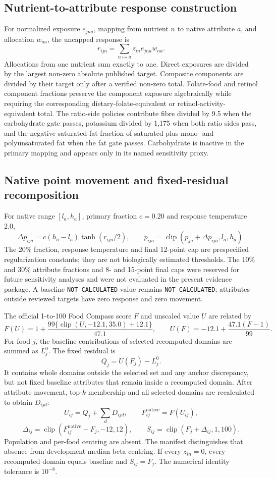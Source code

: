 \subsection*{Nutrient-to-attribute response construction}

For normalized exposure \(e_{jna}\), mapping from nutrient \(n\) to native
attribute \(a\), and allocation \(w_{na}\), the uncapped response is
\[
r_{ija}=\sum_{n\mapsto a}z_{in}e_{jna}w_{na}.
\]
Allocations from one nutrient sum exactly to one. Direct exposures are divided
by the largest non-zero absolute published target. Composite components are
divided by their target only after a verified non-zero total. Folate-food and
retinol component fractions preserve the component exposure algebraically while
requiring the corresponding dietary-folate-equivalent or retinol-activity-
equivalent total. The ratio-side policies contribute fibre divided by 9.5 when
the carbohydrate gate passes, potassium divided by 1,175 when both ratio sides
pass, and the negative saturated-fat fraction of saturated plus mono- and
polyunsaturated fat when the fat gate passes. Carbohydrate is inactive in the
primary mapping and appears only in its named sensitivity proxy.

\subsection*{Native point movement and fixed-residual recomposition}

For native range \([l_a,h_a]\), primary fraction \(c=0.20\) and response
temperature 2.0,
\[
\Delta p_{ija}=c(h_a-l_a)\tanh(r_{ija}/2),\qquad
p_{ija}=\operatorname{clip}(p_{ja}+\Delta p_{ija},l_a,h_a).
\]
The 20\% fraction, response temperature and final 12-point cap are
prespecified regularization constants; they are not biologically estimated
thresholds. The 10\% and 30\% attribute fractions and 8- and 15-point final caps
were reserved for future sensitivity analyses and were not evaluated in the
present evidence package.
A baseline \texttt{NOT\_CALCULATED} value remains
\texttt{NOT\_CALCULATED}; attributes outside reviewed targets have zero
response and zero movement.

The official 1-to-100 Food Compass score \(F\) and unscaled value \(U\) are
related by
\[
F(U)=1+\frac{99\{\operatorname{clip}(U,-12.1,35.0)+12.1\}}{47.1},
\qquad
U(F)=-12.1+\frac{47.1(F-1)}{99}.
\]
For food \(j\), the baseline contributions of selected recomputed domains are
summed as \(L^0_j\). The fixed residual is
\[
Q_j=U(F_j)-L^0_j.
\]
It contains whole domains outside the selected set and any anchor discrepancy,
but not fixed baseline attributes that remain inside a recomputed domain. After
attribute movement, top-\(k\) membership and all selected domains are
recalculated to obtain \(D_{ijd}\):
\[
U_{ij}=Q_j+\sum_dD_{ijd},\qquad
F^{\mathrm{native}}_{ij}=F(U_{ij}),
\]
\[
\Delta_{ij}=\operatorname{clip}
\left(F^{\mathrm{native}}_{ij}-F_j,-12,12\right),\qquad
S_{ij}=\operatorname{clip}(F_j+\Delta_{ij},1,100).
\]
Population and per-food centring are absent. The manifest distinguishes that absence from development-median beta centring. If every
\(z_{in}=0\), every recomputed domain equals baseline and
\(S_{ij}=F_j\). The numerical identity tolerance is \(10^{-8}\).

